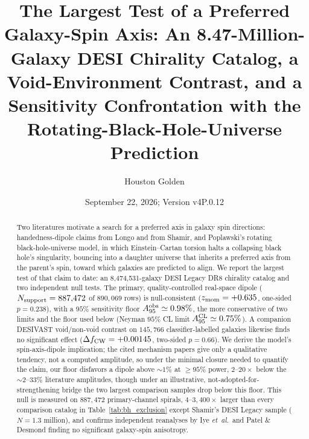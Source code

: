 \documentclass[twocolumn,linenumbers]{aastex702}
\newcommand{\etal}{\textit{et~al.}}
\newcommand{\paperVersion}{v4P.0.12}
\newcommand{\paperTimestamp}{September 22, 2026}
\begin{document}
\raggedbottom

\title{The Largest Test of a Preferred Galaxy-Spin Axis: An 8.47-Million-Galaxy
DESI Chirality Catalog, a Void-Environment Contrast, and a Sensitivity
Confrontation with the Rotating-Black-Hole-Universe Prediction}

\author{Houston Golden}

\date{\paperTimestamp; Version \paperVersion}

\begin{abstract}
Two literatures motivate a search for a preferred axis in galaxy spin
directions: handedness-dipole claims from Longo and from Shamir, and
Poplawski's rotating black-hole-universe model, in which Einstein--Cartan
torsion halts a collapsing black hole's singularity, bouncing into a
daughter universe that inherits a preferred axis from the parent's spin, toward
which galaxies are predicted to align. We report the largest test of that
claim to date: an 8,474,531-galaxy DESI Legacy DR8 chirality catalog and two
independent null tests. The primary, quality-controlled real-space dipole
($N_{\rm support}=887{,}472$ of $890{,}069$ rows) is null-consistent
($z_{\rm mom}=+0.635$, one-sided $p=0.238$), with a $95\%$ sensitivity floor
$A_{95}^{\rm obs}\simeq0.98\%$, the more conservative of two limits and the
floor used below (Neyman $95\%$ CL limit $A_{95}^{\rm CL}\simeq0.75\%$). A companion DESIVAST
void/non-void contrast on $145{,}766$ classifier-labelled galaxies likewise
finds no significant effect ($\Delta f_{\rm CW}=+0.00145$, two-sided
$p=0.66$). We derive the model's spin-axis-dipole implication; the cited
mechanism papers give only a qualitative tendency, not a computed
amplitude, so under the minimal closure needed to quantify the claim, our
floor disfavors a dipole above $\sim\!1\%$ at $\geq\!95\%$ power,
$2$--$20\times$ below the $\sim\!2$--$33\%$ literature amplitudes, though
under an illustrative, not-adopted-for-strengthening bridge the two largest
comparison samples drop below this floor. This null is measured on
$887{,}472$ primary-channel spirals, $4$--$3{,}400\times$ larger than every
comparison catalog in Table~\ref{tab:bh_exclusion} except Shamir's DESI
Legacy sample ($N=1.3$ million), and confirms independent reanalyses by
Iye \etal\ and Patel \& Desmond finding no significant galaxy-spin
anisotropy.
\end{abstract}

\end{document}
